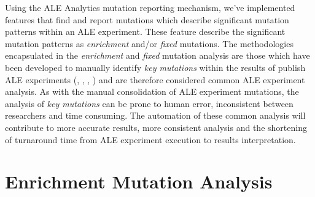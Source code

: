 \documentclass[12pt,final,masters,chapterheads]{ucsd}  %
\begin{document}
Using the ALE Analytics mutation reporting mechanism, we've implemented features that find and report mutations which describe significant mutation patterns within an ALE experiment. These feature describe the significant mutation patterns as \textit{enrichment} and/or \textit{fixed} mutations. The methodologies encapsulated in the \textit{enrichment} and \textit{fixed} mutation analysis are those which have been developed to manually identify \textit{key mutations} within the results of publish ALE experiments (\cite{10.1371/journal.pgen.1001186}, \cite{pmid25015645}, \cite{pmid26964043}, \cite{pmid25304508}) and are therefore considered common ALE experiment analysis. As with the manual consolidation of ALE experiment mutations, the analysis of \textit{key mutations} can be prone to human error, inconsistent between researchers and time consuming. The automation of these common analysis will contribute to more accurate results, more consistent analysis and the shortening of turnaround time from ALE experiment execution to results interpretation.

%
%

\section{Enrichment Mutation Analysis}

%
%

%
%

%
%
\end{document}
